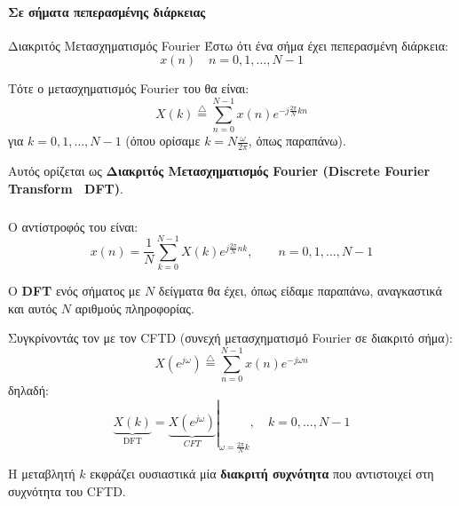 \documentclass[11pt,a4paper,notitlepage,fleqn,draft]{article}
\begin{document}
\paragraph{Σε σήματα πεπερασμένης διάρκειας} \hspace{0pt}

\begin{defn}[label=defn:dft]{Διακριτός Μετασχηματισμός Fourier}{}
	Έστω ότι ένα σήμα έχει πεπερασμένη διάρκεια:
	\[
	x(n) \quad n = 0,1,\dots, N-1
	\]
	
	Τότε ο μετασχηματισμός Fourier του θα είναι:
	\[
	X(k) \overset{\triangle}{=} \sum_{n=0}^{N-1}
	x(n) e^{-j\frac{2π}{N} kn}
	\] για \( k=0,1,\dots,N-1 \) (όπου ορίσαμε \( k = N \frac{\omega}{2\pi} \), όπως παραπάνω).
	
	Αυτός ορίζεται ως \textbf{Διακριτός Μετασχηματισμός Fourier (Discrete Fourier Transform \textemdash~DFT)}.
\end{defn}

\subparagraph{}
Ο αντίστροφός του είναι:
\[
x(n) = \frac{1}{N} \sum_{k=0}^{N-1} X(k) e^{j\frac{2\pi}{N}nk},\qquad n=0,1,\dots,N-1
\]

Ο \textbf{DFT} ενός σήματος με \( N \) δείγματα θα έχει, όπως είδαμε παραπάνω, αναγκαστικά και αυτός
\( N \) αριθμούς πληροφορίας.

Συγκρίνοντάς τον με τον CFTD (συνεχή μετασχηματισμό Fourier σε διακριτό σήμα):
\[
X\left(e^{j\omega }\right) \overset{\triangle}{=} \sum_{n=0}^{N-1} x(n)e^{-j\omega n}
\]
δηλαδή:
\[
\underbrace{X(k)}_{\text{DFT}} = \left. \underbrace{X\left(e^{j\omega }\right)}_{CFT} \right|_{\omega = \frac{2π}{N}k},\quad k=0,\dots,N-1
\]

Η μεταβλητή \( k \) εκφράζει ουσιαστικά μία \textbf{διακριτή συχνότητα} που αντιστοιχεί στη συχνότητα του CFTD.
\end{document}
